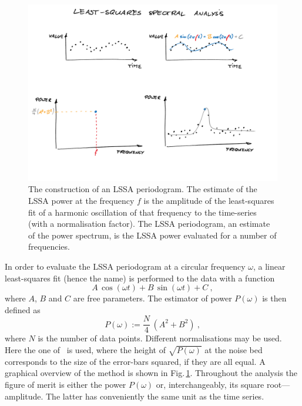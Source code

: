 \begin{figure}
  \centering
  \includegraphics[width=\linewidth]{gfx/axions/LSSA}
  \caption{The construction of an LSSA periodogram.
  The estimate of the LSSA power at the frequency $f$ is the amplitude of the least-squares fit of a harmonic oscillation of that frequency to the time-series (with a normalisation factor).
  The LSSA periodogram, an estimate of the power spectrum, is the LSSA power evaluated for a number of frequencies.}\label{fig:LSSA_overview}
\end{figure}

In order to evaluate the LSSA periodogram at a circular frequency $\omega$, a linear least-squares fit (hence the name) is performed to the data with a function
\begin{equation}
  A\,\cos(\omega t) + B\,\sin(\omega t) + C \ ,
\end{equation}
where $A$, $B$ and $C$ are free parameters. The estimator of power $P(\omega)$ is then defined as
\begin{equation}
  P(\omega) := \frac{N}{4} \, \left( A^2 + B^2 \right) \ ,
\end{equation}
where $N$ is the number of data points. Different normalisations may be used.
Here the one of~\cite{Scargle1982} is used, where the height of $\sqrt{P(\omega)}$ at the noise bed corresponds to the size of the error-bars squared, if they are all equal. A graphical overview of the method is shown in Fig.\,\ref{fig:LSSA_overview}. Throughout the analysis the figure of merit is either the power $P(\omega)$ or, interchangeably, its square root---amplitude. The latter has conveniently the same unit as the time series.

